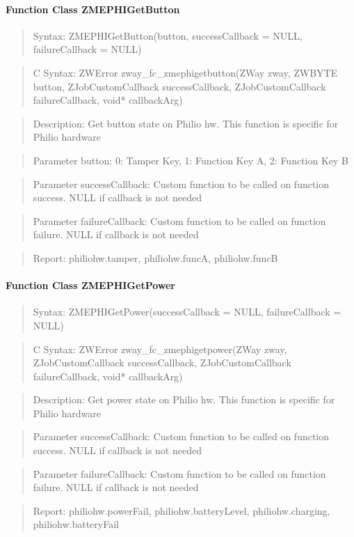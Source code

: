 \paragraph{Function Class ZMEPHIGetButton}
\begin{quote}Syntax: ZMEPHIGetButton(button, successCallback = NULL, failureCallback = NULL)\end{quote}
\begin{quote}C Syntax: ZWError zway\_fc\_zmephigetbutton(ZWay zway, ZWBYTE button, ZJobCustomCallback successCallback, ZJobCustomCallback failureCallback, void* callbackArg)\end{quote}
\begin{quote}Description: Get button state on Philio hw. This function is specific for Philio hardware\end{quote}
\begin{quote}Parameter button: 0: Tamper Key, 1: Function Key A, 2: Function Key B\end{quote}
\begin{quote}Parameter successCallback: Custom function to be called on function success. NULL if callback is not needed\end{quote}
\begin{quote}Parameter failureCallback: Custom function to be called on function failure. NULL if callback is not needed\end{quote}
\begin{quote}Report: philiohw.tamper, philiohw.funcA, philiohw.funcB\end{quote}

\paragraph{Function Class ZMEPHIGetPower}
\begin{quote}Syntax: ZMEPHIGetPower(successCallback = NULL, failureCallback = NULL)\end{quote}
\begin{quote}C Syntax: ZWError zway\_fc\_zmephigetpower(ZWay zway, ZJobCustomCallback successCallback, ZJobCustomCallback failureCallback, void* callbackArg)\end{quote}
\begin{quote}Description: Get power state on Philio hw. This function is specific for Philio hardware\end{quote}
\begin{quote}Parameter successCallback: Custom function to be called on function success. NULL if callback is not needed\end{quote}
\begin{quote}Parameter failureCallback: Custom function to be called on function failure. NULL if callback is not needed\end{quote}
\begin{quote}Report: philiohw.powerFail, philiohw.batteryLevel, philiohw.charging, philiohw.batteryFail\end{quote}

